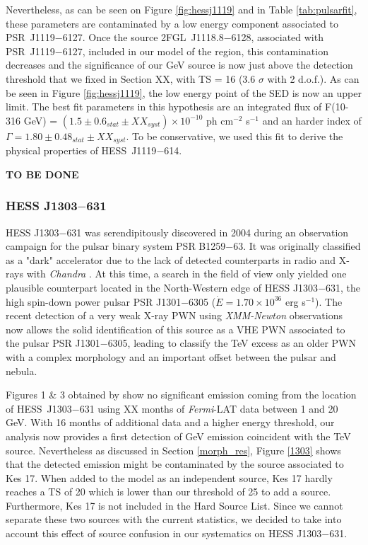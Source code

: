 Nevertheless, as can be seen on Figure \ref{fig:hessj1119} and in Table \ref{tab:pulsarfit}, these parameters are contaminated by a low energy component associated to PSR~J1119$-$6127. Once the source 2FGL~J1118.8$-$6128, associated with PSR~J1119$-$6127, included in our model of the region, this contamination decreases and the significance of our GeV source is now just above the detection threshold that we fixed in Section XX, with TS = 16 (3.6 $\sigma$ with 2 d.o.f.). As can be seen in Figure \ref{fig:hessj1119}, the low energy point of the SED is now an upper limit. The best fit parameters in this hypothesis are an integrated flux of F(10-316 GeV) = $(1.5 \pm 0.6_{stat} \pm XX_{syst})\times 10^{-10}$ ph cm$^{-2}$ s$^{-1}$ and an harder index of $\Gamma = 1.80 \pm 0.48_{stat} \pm XX_{syst}$. To be conservative, we used this fit to derive the physical properties of HESS~J1119$-$614. 

\textbf{TO BE DONE}

\subsubsection*{HESS J1303$-$631}

HESS J1303$-$631 was serendipitously discovered in 2004 \citep{2005AA...439.1013A} during an observation campaign for the pulsar binary system PSR B1259$-$63. It was originally classified as a "dark" accelerator due to the lack of detected counterparts in radio and X-rays with \emph{Chandra} \citep{2005ApJ...629.1017M}. At this time, a search in the field of view only yielded one plausible counterpart located in the North-Western edge of HESS J1303$-$631, the high spin-down power pulsar PSR J1301$-$6305 ($\dot{E} = 1.70 \times 10^36$ erg s$^{-1}$). The recent detection of a very weak X-ray PWN using \emph{XMM-Newton} observations now allows the solid identification of this source as a VHE PWN associated to the pulsar PSR J1301$-$6305, leading \cite{2011arXiv1104.1680D} to classify the TeV excess as an older PWN with a complex morphology and an important offset between the pulsar and nebula.

Figures 1 \& 3 obtained by \cite{2011ApJ...740L..12W} show no significant emission coming from the location of HESS~J1303$-$631 using XX months of \emph{Fermi}-LAT data between 1 and 20 GeV. With 16 months of additional data and a higher energy threshold, our analysis now provides a first detection of GeV emission coincident with the TeV source. Nevertheless as discussed in Section \ref{morph_res}, Figure \ref{1303} shows that the detected emission might be contaminated by the source associated to Kes 17. When added to the model as an independent source, Kes 17 hardly reaches a TS of 20 which is lower than our threshold of 25 to add a source. Furthermore, Kes 17 is not included in the Hard Source List. Since we cannot separate these two sources with the current statistics, we decided to take into account this effect of source confusion in our systematics on HESS J1303$-$631.

